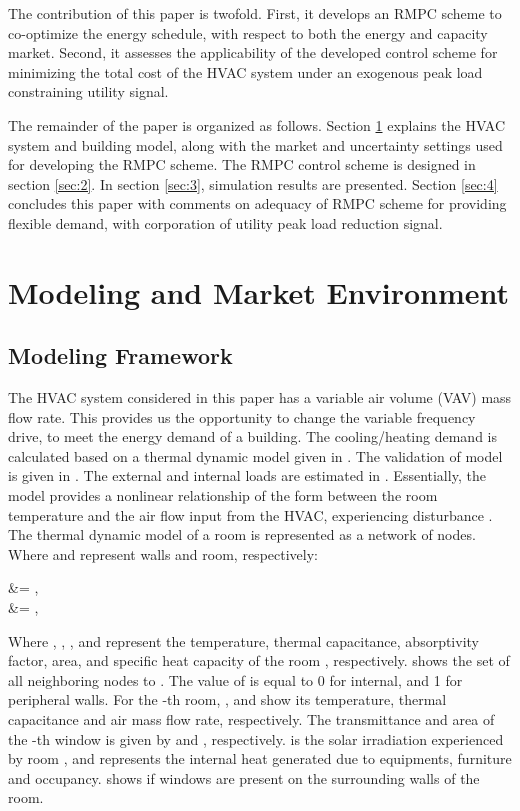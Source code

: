 \documentclass[conference,10pt]{IEEEtran}
\begin{document}
The contribution of this paper is twofold. First, it develops an RMPC scheme to co-optimize the energy schedule, with respect to both the energy and capacity market. Second, it assesses the applicability of the developed control scheme for minimizing the total cost of the HVAC system under an exogenous peak load constraining utility signal.

The remainder of the paper is organized as follows. Section \ref{sec:1} explains the HVAC system and building model, along with the market and uncertainty settings used for developing the RMPC scheme. The RMPC control scheme is designed in section \ref{sec:2}. In section \ref{sec:3}, simulation results are presented. Section \ref{sec:4} concludes this paper with comments on adequacy of RMPC scheme for providing flexible demand, with corporation of utility peak load reduction signal.
\section{Modeling and Market Environment}\label{sec:1}
\subsection{Modeling Framework}

The HVAC system considered in this paper has a variable air volume (VAV) mass flow rate. This provides us the opportunity to change the variable frequency drive, to meet the energy demand of a building. The cooling/heating demand is calculated based on a thermal dynamic model given in \cite{Mehdi1}. The validation of model is given in \cite{Mehdi2}. The external and internal loads are estimated in \cite{Mehdi3}. Essentially, the model provides a nonlinear relationship of the form  between the room temperature  and the air flow input  from the HVAC, experiencing disturbance . The thermal dynamic model of a room is represented as a network of  nodes. Where  and  represent walls and room, respectively:

	 &= , \\
	 &= ,

Where , , ,  and  represent the temperature, thermal capacitance, absorptivity factor, area, and specific heat capacity of the room , respectively.  shows the set of all neighboring nodes to . The value of  is equal to 0 for internal, and 1 for peripheral walls. For the -th room, ,  and  show its temperature, thermal capacitance and air mass flow rate, respectively. The transmittance and area of the -th window is given by  and , respectively.  is the solar irradiation experienced by room , and  represents the internal heat generated due to equipments, furniture and occupancy.  shows if windows are present on the surrounding walls of the room.
\end{document}
